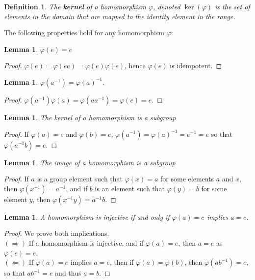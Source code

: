\documentclass[12pt]{report}
\newtheorem{lemma}[theorem]{Lemma}
\newtheorem{definition}{Definition}
\begin{document}
\begin{definition}
    The {\bf kernel} of a homomorphism $\varphi$, denoted $\ker(\varphi)$ is the set of elements in the domain that are mapped to the identity element in the range.
\end{definition}

The following properties hold for any homomorphism $\varphi$:

\begin{lemma} $\varphi(e) = e$ \end{lemma}
\begin{proof} $\varphi(e) = \varphi(ee) = \varphi(e)\varphi(e)$, hence $\varphi(e)$ is idempotent. \end{proof}

\begin{lemma} $\varphi(a^{-1}) = \varphi(a)^{-1}$. \end{lemma}
\begin{proof} $\varphi(a^{-1})\varphi(a) = \varphi(aa^{-1}) = \varphi(e) = e$. \end{proof}

\begin{lemma} The kernel of a homomorphism is a subgroup \end{lemma}
\begin{proof} If $\varphi(a) = e$ and $\varphi(b) = e$, $\varphi(a^{-1}) = \varphi(a)^{-1} = e^{-1} = e$ so that $\varphi(a^{-1}b) = e$. \end{proof}

\begin{lemma} The image of a homomorphism is a subgroup \end{lemma}
\begin{proof} If $a$ is a group element such that $\varphi(x) = a$ for some elements $a$ and $x$, then $\varphi(x^{-1}) = a^{-1}$, and if $b$ is an element such that $\varphi(y) = b$ for some element $y$, then $\varphi(x^{-1}y) = a^{-1}b$. \end{proof}

\begin{lemma} A homomorphism is injective if and only if $\varphi(a) = e$ implies $a = e$. \end{lemma}
\begin{proof} We prove both implications.\\
$(\Rightarrow)$ If a homomorphism is injective, and if $\varphi(a) = e$, then $a = e$ as $\varphi(e) = e$.\\
$(\Leftarrow)$ If $\varphi(a) = e$ implies $a = e$, then if $\varphi(a) = \varphi(b)$, then $\varphi(ab^{-1}) = e$, so that $ab^{-1} = e$ and thus $a = b$.
\end{proof}
\end{document}
